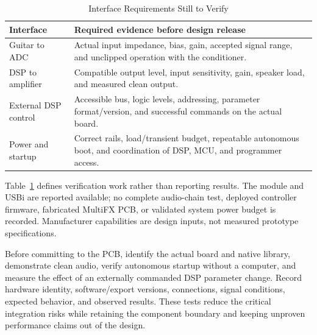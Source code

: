 \documentclass[conference]{IEEEtran}
\begin{document}
\begin{table}[t]
  \caption{Interface Requirements Still to Verify}
  \label{tab:interfaces}
  \centering
  \footnotesize
  \setlength{\tabcolsep}{3pt}
  \renewcommand{\arraystretch}{1.12}
  \begin{tabular}{@{}>{\raggedright\arraybackslash}p{}
                      >{\raggedright\arraybackslash}p{}@{}}
    \toprule
    Interface & Required evidence before design release \\
    \midrule
    Guitar to ADC &
      Actual input impedance, bias, gain, accepted signal range,
      and unclipped operation with the conditioner. \\
    DSP to amplifier &
      Compatible output level, input sensitivity, gain, speaker load,
      and measured clean output. \\
    External DSP control &
      Accessible bus, logic levels, addressing, parameter format/version,
      and successful commands on the actual board. \\
    Power and startup &
      Correct rails, load/transient budget, repeatable autonomous boot,
      and coordination of DSP, MCU, and programmer access. \\
    \bottomrule
  \end{tabular}
\end{table}

Table~\ref{tab:interfaces} defines verification work rather than reporting
results. The module and USBi are reported available; no complete audio-chain
test, deployed controller firmware, fabricated MultiFX PCB, or validated
system power budget is recorded. Manufacturer capabilities are design
inputs, not measured prototype specifications.

Before committing to the PCB, identify the actual board and native library,
demonstrate clean audio, verify autonomous startup without a computer, and
measure the effect of an externally commanded DSP parameter change.
Record hardware identity, software/export versions, connections, signal
conditions, expected behavior, and observed results. These tests reduce the
critical integration risks while retaining the component boundary and
keeping unproven performance claims out of the design.
\end{document}
